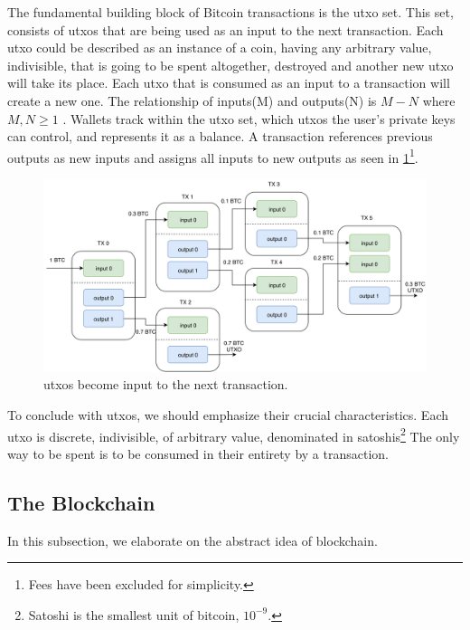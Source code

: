 The fundamental building block of Bitcoin transactions is the \acrshort{utxo} set. This set, consists of \acrshort{utxo}s that are being used as an input to the next transaction. Each \acrshort{utxo} could be described as an instance of a coin, having any arbitrary value, indivisible, that is going to be spent altogether, destroyed and another new \acrshort{utxo} will take its place. Each \acrshort{utxo} that is consumed as an input to a transaction will create a new one. The relationship of inputs(M) and outputs(N) is $M-N $ where $M,N\geq1$ . Wallets track within the \acrshort{utxo} set, which \acrshort{utxo}s the user's private keys can control, and represents it as a balance. A transaction references previous outputs as new inputs and assigns all inputs to new outputs as seen in \ref{fig:utxo}\footnote{Fees have been excluded for simplicity.}.
\begin{figure}[h]
    \centering
    \includegraphics[width=1\textwidth]{images/utxo.png}
    \caption{\acrshort{utxo}s become input to the next transaction.}
    \label{fig:utxo}
\end{figure}

To conclude with \acrshort{utxo}s, we should emphasize their crucial characteristics. Each \acrshort{utxo} is discrete, indivisible, of arbitrary value, denominated in satoshis\footnote{Satoshi is the smallest unit of bitcoin, \bitcoin$10^{-9}$.} The only way to be spent is to be consumed in their entirety by a transaction.
\subsection{The Blockchain}
In this subsection, we elaborate on the abstract idea of blockchain.

